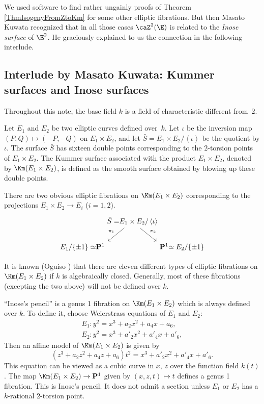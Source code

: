 \documentclass{article}
\def\P{\mathbf{P}}
\newcommand{\class}[1]{\left< #1 \right>}
\begin{document}
We used software to find rather ungainly proofs of Theorem \ref{ThmIsogenyFromZtoKm} for some other elliptic fibrations.  But then Masato Kuwata recognized that in all those cases $\caZ^2(\E)$ is related to the {\em Inose surface} of $\E^2$.  He graciously explained to us the connection in the following interlude.


\subsection{Interlude by Masato Kuwata:  Kummer surfaces and Inose surfaces}
\label{sec:MasatoAppendix}


Throughout this note, the base field $k$ is a field of characteristic different from~$2$.

Let $E_{1}$ and $E_{2}$ be two elliptic curves defined over~$k$.
Let $\iota$ be the inversion map $(P,Q)\mapsto (-P,-Q)$ on $E_{1}\times E_{2}$, and let $\bar S=E_{1}\times E_{2}/\class{\iota}$ be the quotient by $\iota$.  The surface $\bar S$ has sixteen double points corresponding to the $2$-torsion points of $E_{1}\times E_{2}$. 
The Kummer surface associated with the product $E_{1}\times E_{2}$, denoted by $\Km(E_{1}\times E_{2})$, is defined as the smooth surface obtained by blowing up these double points. 

There are two obvious elliptic fibrations on $\Km(E_{1}\times E_{2})$ corresponding to the projections $E_{1}\times E_{2}\to E_{i}$ ($i=1,2$).  
\[
\begin{tikzcd}[column sep = small]
             & \hbox to 0pt{\hss $\bar S = $} E_{1}\times E_{2}\hbox to 0pt {$/\class{\iota}$\hss} \arrow[ld, "\pi_{1}"'] \arrow[rd, "\pi_{2}"] &              \\
{\hbox to 0pt{\hss$E_{1}/\{\pm 1\}\simeq$}\P^{1}} &                                                                        & {\P^{1}\hbox to 0pt{$\simeq E_{2}/\{\pm 1\}$\hss}}
\end{tikzcd}
\]

It is known (Oguiso \cite{Oguiso}) that there are eleven different types of elliptic fibrations on $\Km(E_{1}\times E_{2})$ if $k$ is algebraically closed.  Generally, most of these fibrations (excepting the two above) will not be defined over $k$.

``Inose's pencil'' \cite{Kuwata-Shioda} is a genus 1 fibration on $\Km(E_1\times E_2)$ which is always defined over $k$.  To define it, 
choose Weierstrass equations of $E_{1}$ and $E_{2}$:
\begin{align*}
E_{1}: y^2 = x^3 + a_{2}x^2 + a_{4}x + a_{6},\\
E_{2}: y^2 = x^3 + a'_{2}x^2 + a'_{4}x + a'_{6},
\end{align*}
Then an affine model of $\Km(E_{1}\times E_{2})$ is given by
\begin{equation}\label{eq:affine}
(z^3 + a_{2}z^2 + a_{4}z + a_{6})t^{2}
= x^3 + a'_{2}x^2 + a'_{4}x + a'_{6}.
\end{equation}
This equation can be viewed as a cubic curve in $x$, $z$ over the function field $k(t)$.  
The map $\Km(E_{1}\times E_{2})\to \P^{1}$ given by $(x,z,t)\mapsto t$ defines a genus 1 fibration.  This is Inose's pencil.  It does not admit a section unless $E_1$ or $E_2$ has a $k$-rational 2-torsion point.  
\end{document}
